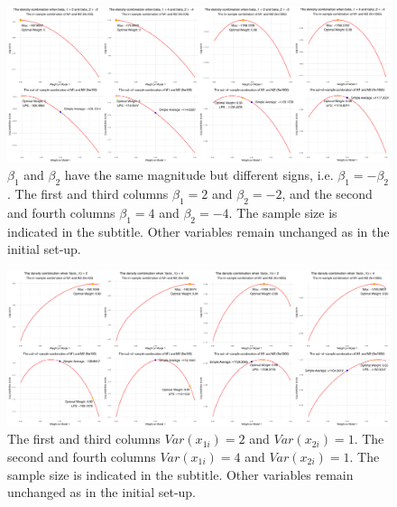 \documentclass{monashthesis}
\begin{document}
\begin{figure}[ht]
\centering
\includegraphics[scale=0.18, angle=90]{backup_figure/betasign11.jpg}
\caption{$\beta_1$ and $\beta_2$ have the same magnitude but different signs, i.e. $\beta_1=-\beta_2$. The first and third columns $\beta_1=2$ and $\beta_2=-2$, and the second and fourth columns $\beta_1=4$ and $\beta_2=-4$. The sample size is indicated in the subtitle. Other variables remain unchanged as in the initial set-up.}
\label{fig:sign}
\end{figure}

\begin{figure}[ht]
\centering
\includegraphics[scale=0.18, angle=90]{backup_figure/var11.jpg}
\caption{The first and third columns $Var(x_{1i}) = 2$ and $Var(x_{2i}) = 1$. The second and fourth columns $Var(x_{1i}) = 4$ and $Var(x_{2i}) = 1$. The sample size is indicated in the subtitle. Other variables remain unchanged as in the initial set-up.}
\label{fig:variance}
\end{figure}

\printbibliography[title={Reference}]
\end{document}
